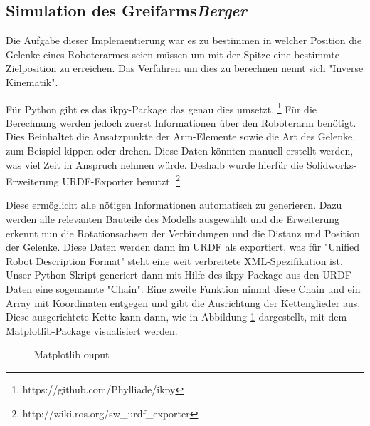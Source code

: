 \subsection{Simulation des Greifarms\hfill\textnormal{\emph{Berger}}}
Die Aufgabe dieser Implementierung war es
zu bestimmen in welcher Position die Gelenke eines Roboterarmes 
seien müssen um mit der Spitze eine bestimmte Zielposition zu erreichen.
Das Verfahren um dies zu berechnen nennt sich "Inverse Kinematik".

Für Python gibt es das ikpy-Package das genau dies umsetzt.
\footnote{https://github.com/Phylliade/ikpy}
Für die Berechnung werden jedoch zuerst Informationen über den Roboterarm benötigt.
Dies Beinhaltet die Ansatzpunkte der Arm-Elemente sowie die Art des Gelenke, 
zum Beispiel kippen oder drehen.
Diese Daten könnten manuell erstellt werden, 
was viel Zeit in Anspruch nehmen würde.
Deshalb wurde hierfür die Solidworks-Erweiterung URDF-Exporter benutzt.
\footnote{http://wiki.ros.org/sw\_urdf\_exporter}

Diese ermöglicht alle nötigen Informationen automatisch zu generieren.
Dazu werden alle relevanten Bauteile des Modells ausgewählt
und die Erweiterung erkennt nun die Rotationsachsen der Verbindungen 
und die Distanz und Position der Gelenke.
Diese Daten werden dann im URDF als exportiert,
was für "Unified Robot Description Format" steht 
eine weit verbreitete XML-Spezifikation ist.\cite{mathWorks}
\\

Unser Python-Skript generiert dann mit Hilfe des ikpy Package
aus den URDF-Daten eine sogenannte "Chain".
Eine zweite Funktion nimmt diese Chain und ein Array mit Koordinaten entgegen
und gibt die Ausrichtung der Kettenglieder aus.
Diese ausgerichtete Kette kann dann, 
wie in Abbildung \ref{fig:greifarm1} dargestellt,
mit dem Matplotlib-Package visualisiert werden.

\begin{figure}[H]
  \caption{Matplotlib ouput}
  \label{fig:greifarm1}
\end{figure}

